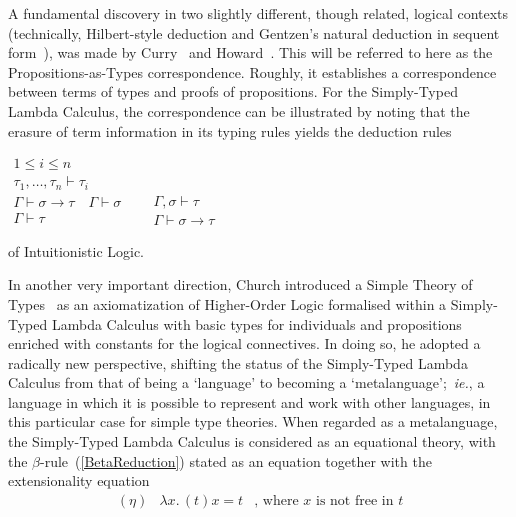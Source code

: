 \documentclass[11pt,twocolumn]{article}
\newcommand{\ie}{\emph{ie.}}
\begin{document}
A fundamental discovery in two slightly different, though related, logical
contexts (technically, Hilbert-style deduction %
and Gentzen's natural deduction in sequent form~\cite{Gentzen1935}), was made
by Curry~\cite{Curry1934} and Howard~\cite{Howard1969}.  This will be
referred to here as the 
Propositions-as-Types correspondence. %
Roughly, it establishes a correspondence between terms of types and proofs
of propositions.  For the Simply-Typed Lambda Calculus, the correspondence
can be illustrated by noting that the erasure of term information in its
typing rules yields the deduction rules
  \begin{center}
  $\begin{array}{c}
    1\leq i\leq n
    \\ \hline
    \tau_1,\ldots,\tau_n\vdash \tau_i
  \end{array}$
  \\[2mm]
  $\begin{array}{c}
    \Gamma\vdash \sigma\to\tau
    \quad 
    \Gamma\vdash\sigma 
    \\ \hline
    \Gamma\vdash\tau
  \end{array}
  \enspace\quad
  \begin{array}{c}
    \Gamma,\sigma\vdash\tau
    \\ \hline
    \Gamma\vdash\sigma\to\tau
  \end{array}$
\end{center}
of Intuitionistic %
Logic. %

In another very important direction, Church introduced a Simple Theory of
Types~\cite{Church1940} as an axiomatization of Higher-Order Logic
formalised within a Simply-Typed Lambda Calculus with basic types
for individuals and propositions enriched with constants for the logical
connectives.  In doing so, he adopted a radically new perspective,
shifting the status of the Simply-Typed Lambda Calculus from that of being
a `language' to becoming a `metalanguage';~\ie, a language in which it is
possible to represent and work with other languages, in this particular case
for simple type theories.  When regarded as a metalanguage, the Simply-Typed
Lambda Calculus is considered as an equational theory, with the
\mbox{$\beta$-rule}~(\ref{BetaReduction}) stated as an equation together with
the extensionality equation
\[\begin{array}{rll}
(\eta) & \lambda x.\,(t)x = t 
& \mbox{, where $x$ is not free in $t$}
  \end{array}\]
\end{document}
